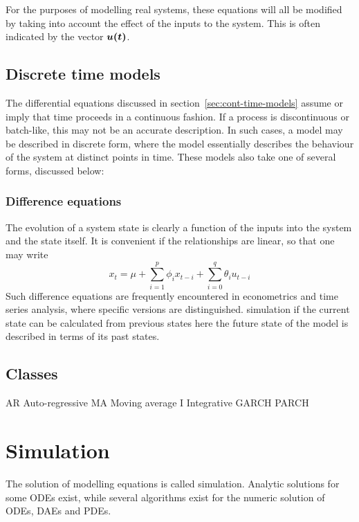 For the purposes of modelling real systems, these equations will all be modified by taking into account the effect of the inputs to the system.
This is often indicated by the vector $\boldsymbol{u(t)}$.


\subsection{Discrete time models}
The differential equations discussed in section~\ref{sec:cont-time-models} assume or imply that time proceeds in a continuous fashion.
If a process is discontinuous or batch-like, this may not be an accurate description.
In such cases, a model may be described in discrete form, where the model essentially describes the behaviour of the system at distinct points in time.
These models also take one of several forms, discussed below:
 
\subsubsection{Difference equations}
The evolution of a system state is clearly a function of the inputs into the system and the state itself.
It is convenient if the relationships are linear, so that one may write
\begin{equation}
  \label{eq:diff}
  x_t = \mu + \sum_{i=1}^{p}\phi_i x_{t-i} + \sum_{i=0}^{q}\theta_i u_{t-i}
\end{equation}
Such difference equations are frequently encountered in econometrics and time series analysis, where specific versions are distinguished.
simulation if the current state can be calculated from previous states here the future state of the model is described in terms of its past states.

\subsection{Classes}
AR Auto-regressive %
MA Moving average %
I Integrative
GARCH
PARCH

\section{Simulation}
The solution of modelling equations is called simulation.  
Analytic solutions for some ODEs exist, while several algorithms exist for the numeric solution of ODEs, DAEs and PDEs.

